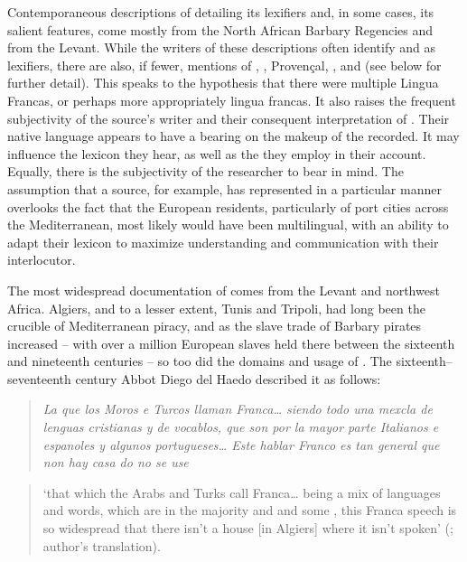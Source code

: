 \documentclass[output=paper]{langsci/langscibook}
\begin{document}
	Contemporaneous descriptions of  detailing its lexifiers and, in some cases, its salient features, come mostly from the North African Barbary Regencies and from the Levant. While the writers of these descriptions often identify  and  as lexifiers, there are also, if fewer, mentions of , , Provençal, ,  and  (see below for further detail). This speaks to the hypothesis that there were multiple Lingua Francas, or perhaps more appropriately lingua francas. It also raises the frequent subjectivity of the source’s writer and their consequent interpretation of . Their native language appears to have a bearing on the makeup of the  recorded. It may influence the lexicon they hear, as well as the  they employ in their account. Equally, there is the subjectivity of the researcher to bear in mind. The assumption that a  source, for example, has represented  in a particular manner overlooks the fact that the European residents, particularly of port cities across the Mediterranean, most likely would have been multilingual, with an ability to adapt their lexicon to maximize understanding and communication with their interlocutor. 
	
	The most widespread documentation of  comes from the Levant and northwest Africa. Algiers, and to a lesser extent, Tunis and Tripoli, had long been the crucible of Mediterranean piracy, and as the slave trade of Barbary pirates increased – with over a million European slaves held there between the sixteenth and nineteenth centuries \citep[23]{Davis2004} – so too did the domains and usage of . The sixteenth–seventeenth century  Abbot Diego del Haedo described it as follows: 
	
	\begin{quote}
	\textit{La que los Moros e Turcos llaman Franca… siendo todo una mexcla de lenguas cristianas y de vocablos, que son por la mayor parte Italianos e espanoles y algunos portugueses… Este hablar Franco es tan general que non hay casa do no se use}
	\end{quote}
	
	\begin{quote}
	‘that which the Arabs and Turks call Franca… being a mix of  languages and words, which are in the majority  and  and some , this Franca speech is so widespread that there isn’t a house [in Algiers] where it isn’t spoken’  (\citealt[24]{Haedo1612}; author’s translation).
	\end{quote}
	
\end{document}
